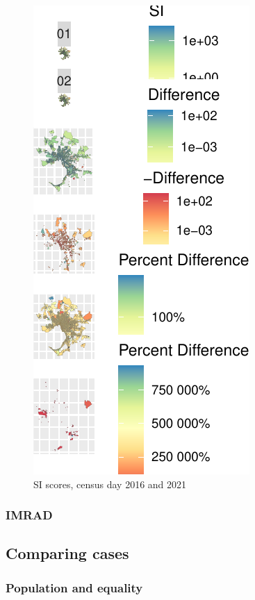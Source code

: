 \documentclass[preprint, 3p,
authoryear]{elsarticle} %
\begin{document}
\begin{figure}
\centering
\includegraphics{Leveraging_GTFS_to_assess_transit_supply_Transport_Geography_files/figure-latex/Greater_Melbourne_2016_2021-1.pdf}
\caption{SI scores, census day 2016 and 2021}
\end{figure}

\hypertarget{imrad}{%
\subsubsection{IMRAD}\label{imrad}}

\hypertarget{comparing-cases}{%
\subsection{Comparing cases}\label{comparing-cases}}

\hypertarget{population-and-equality}{%
\subsubsection{Population and equality}\label{population-and-equality}}
\end{document}

